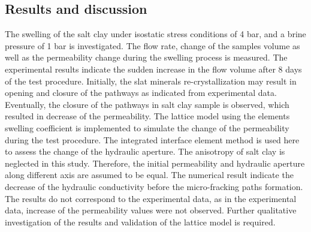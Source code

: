 
\subsection{Results and discussion}

The swelling of the salt clay under isostatic stress conditions of 4 bar, and a brine pressure of 1 bar is investigated. The flow rate, change of the samples volume as well as the permeability change during the swelling process is measured. The experimental results indicate the sudden increase in the flow volume after 8 days of the test procedure. Initially, the slat minerals re-crystallization may result in opening and closure of the pathways as indicated from experimental data. Eventually, the closure of the pathways in salt clay sample is observed, which resulted in decrease of the permeability. The lattice model using the elements swelling coefficient is implemented to simulate the change of the permeability during the test procedure. The integrated interface element method is used here to assess the change of the hydraulic aperture. The anisotropy of salt clay is neglected in this study. Therefore, the initial permeability and hydraulic aperture along different axis are assumed to be equal. The numerical result indicate the decrease of the hydraulic conductivity before the micro-fracking paths formation. The results do not correspond to the experimental data, as in the experimental data, increase of the permeability values were not observed. Further qualitative investigation of the results and validation of the lattice model is required. 